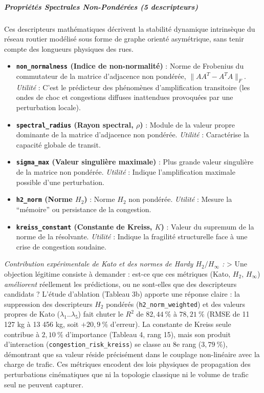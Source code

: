 \documentclass[10pt, a4paper]{article}
\providecommand{\tightlist}{}
\begin{document}
\subparagraph{Propriétés Spectrales Non-Pondérées (5
descripteurs)}\label{propriuxe9tuxe9s-spectrales-non-ponduxe9ruxe9es-5-descripteurs}

Ces descripteurs mathématiques décrivent la stabilité dynamique
intrinsèque du réseau routier modélisé sous forme de graphe orienté
asymétrique, sans tenir compte des longueurs physiques des rues.

\begin{itemize}
\tightlist
\item
  \textbf{\texttt{non\_normalness} (Indice de non-normalité)} : Norme de
  Frobenius du commutateur de la matrice d'adjacence non pondérée,
  \(\|AA^T - A^TA\|_F\). \emph{Utilité} : C'est le prédicteur des
  phénomènes d'amplification transitoire (les ondes de choc et
  congestions diffuses inattendues provoquées par une perturbation
  locale).
\item
  \textbf{\texttt{spectral\_radius} (Rayon spectral, \(\rho\))} : Module
  de la valeur propre dominante de la matrice d'adjacence non pondérée.
  \emph{Utilité} : Caractérise la capacité globale de transit.
\item
  \textbf{\texttt{sigma\_max} (Valeur singulière maximale)} : Plus
  grande valeur singulière de la matrice non pondérée. \emph{Utilité} :
  Indique l'amplification maximale possible d'une perturbation.
\item
  \textbf{\texttt{h2\_norm} (Norme \(H_2\))} : Norme \(H_2\) non
  pondérée. \emph{Utilité} : Mesure la ``mémoire'' ou persistance de la
  congestion.
\item
  \textbf{\texttt{kreiss\_constant} (Constante de Kreiss, \(K\))} :
  Valeur du supremum de la norme de la résolvante. \emph{Utilité} :
  Indique la fragilité structurelle face à une crise de congestion
  soudaine.
\end{itemize}

\emph{Contribution expérimentale de Kato et des normes de Hardy
\(H_2/H_\infty\) :} \textgreater{} Une objection légitime consiste à
demander : est-ce que ces métriques (Kato, \(H_2\), \(H_\infty\))
\emph{améliorent} réellement les prédictions, ou ne sont-elles que des
descripteurs candidats ? L'étude d'ablation (Tableau 3b) apporte une
réponse claire : la suppression des descripteurs \(H_2\) pondérés
(\texttt{h2\_norm\_weighted}) et des valeurs propres de Kato
(\(\lambda_1..\lambda_5\)) fait chuter le \(R^2\) de \(82{,}44\ \%\) à
\(78{,}21\ \%\) (RMSE de 11 127 kg à 13 456 kg, soit \(+20{,}9\ \%\)
d'erreur). La constante de Kreiss seule contribue à \(2{,}10\ \%\)
d'importance (Tableau 4, rang 15), mais son produit d'interaction
(\texttt{congestion\_risk\_kreiss}) se classe au 8e rang
(\(3{,}79\ \%\)), démontrant que sa valeur réside précisément dans le
couplage non-linéaire avec la charge de trafic. Ces métriques encodent
des lois physiques de propagation des perturbations cinématiques que ni
la topologie classique ni le volume de trafic seul ne peuvent capturer.
\end{document}
